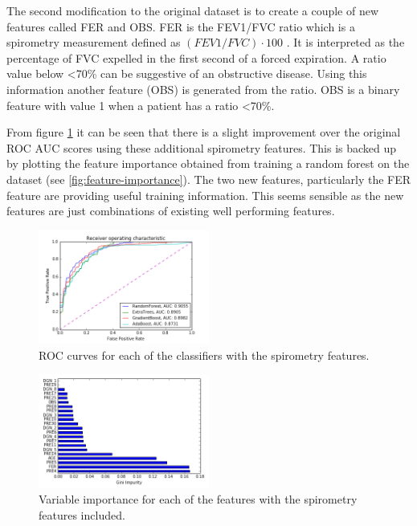 \documentclass[journal]{IEEEtran}
\begin{document}
The second modification to the original dataset is to create a couple of new features called FER and OBS. FER is the FEV1/FVC ratio which is a spirometry measurement defined as $(FEV1/FVC) \cdot 100$ \cite{patient2016spirometry}. It is interpreted as the percentage of FVC expelled in the first second of a forced expiration. A ratio value below <70\% can be suggestive of an obstructive disease. Using this information another feature (OBS) is generated from the ratio. OBS is a binary feature with value 1 when a patient has a ratio <70\%.

From figure \ref{fig:roc-spiro-features} it can be seen that there is a slight improvement over the original ROC AUC scores using these additional spirometry features. This is backed up by plotting the feature importance obtained from training a random forest on the dataset (see \ref{fig:feature-importance}). The two new features, particularly the FER feature are providing useful training information. This seems sensible as the new features are just combinations of existing well performing features.

\begin{figure}[!t]
\centering
\includegraphics[width=0.5\textwidth]{../src/img/roc_spiro_features.png}
\caption{ROC curves for each of the classifiers with the spirometry features.}
\label{fig:roc-spiro-features}
\end{figure}

\begin{figure}[!t]
\centering
\includegraphics[width=0.5\textwidth]{../src/img/importance_spiro_features.png}
\caption{Variable importance for each of the features with the spirometry features included.}
\label{fig:importance-spiro-features}
\end{figure}
\end{document}

